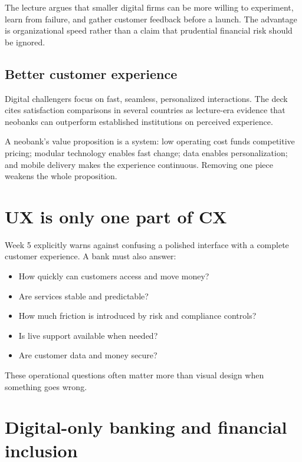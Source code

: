 The lecture argues that smaller digital firms can be more willing to experiment, learn from failure, and gather customer feedback before a launch. The advantage is organizational speed rather than a claim that prudential financial risk should be ignored.

\subsection{Better customer experience}

Digital challengers focus on fast, seamless, personalized interactions. The deck cites satisfaction comparisons in several countries as lecture-era evidence that neobanks can outperform established institutions on perceived experience.

\begin{keyidea}
A neobank's value proposition is a system: low operating cost funds competitive pricing; modular technology enables fast change; data enables personalization; and mobile delivery makes the experience continuous. Removing one piece weakens the whole proposition.
\end{keyidea}

\section{UX is only one part of CX}

Week 5 explicitly warns against confusing a polished interface with a complete customer experience. A bank must also answer:

\begin{itemize}
  \item How quickly can customers access and move money?
  \item Are services stable and predictable?
  \item How much friction is introduced by risk and compliance controls?
  \item Is live support available when needed?
  \item Are customer data and money secure?
\end{itemize}

These operational questions often matter more than visual design when something goes wrong.

\section{Digital-only banking and financial inclusion}

